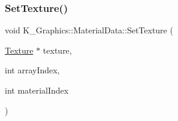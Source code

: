 \mbox{\label{class_k___graphics_1_1_material_data_a5040fffa5ba469df48ed169bf90349e8}} 
\subsubsection{\texorpdfstring{Set\+Texture()}{SetTexture()}}
{\footnotesize\ttfamily void K\+\_\+\+Graphics\+::\+Material\+Data\+::\+Set\+Texture (\begin{DoxyParamCaption}\item[{\mbox{\hyperlink{class_k___graphics_1_1_texture}{Texture}} $\ast$}]{texture,  }\item[{int}]{array\+Index,  }\item[{int}]{material\+Index }\end{DoxyParamCaption})}

